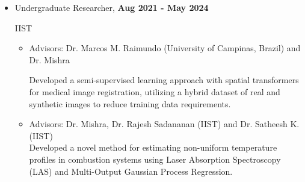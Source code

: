 \documentclass[11pt]{article}
\begin{document}
\begin{itemize}[leftmargin=*,noitemsep,topsep=0pt]
\begin{comment}
			\item Undergraduate Researcher, \hfill \textbf{Aug 2021 - May 2024} \\
	Indian Institute of Space Science and Technology
	\begin{itemize}[leftmargin=*,noitemsep,topsep=0pt]
		\item Collaborated with Dr. Marcos M. Raimundo (University of Campinas, Brazil) and Dr. Mishra to develop a semi-supervised learning approach with spatial transformers for medical image registration, utilizing a hybrid dataset of real and synthetic images to reduce training data requirements while leveraging transfer learning to curtail computational overhead.	
		\item Created and validated a Schlieren/RGB Flame Images Analyzing Tool based on Fast Fourier Transform (FFT) and Wavelet Transform to analyze time-series flame images to identify the region of instability and the corresponding oscillating frequency in collaboration with Dr. Rajesh
		Sadananan (IIST).
		\item Collaborated with Dr. Manoj B.S. (IIST) on a Complex Network Analysis project, focusing on the OPEC Crude Oil Trade Network. Utilized graph theory to model global crude oil flows between nations, identifying key time-series trends and predicting potential fluctuations in price and demand.
	\end{itemize}

\end{comment}

		
	\item Undergraduate Researcher, \hfill \textbf{Aug 2021 - May 2024}
	
	IIST

	
	\begin{itemize}[leftmargin=*,noitemsep,topsep=0pt]
		
		\item Advisors: Dr. Marcos M. Raimundo (University of Campinas, Brazil) and Dr. Mishra
		
		
		Developed a semi-supervised learning approach with spatial transformers for medical image registration, utilizing a hybrid dataset of real and synthetic images to reduce training data requirements.
		
			\item 	Advisors: Dr. Mishra, Dr. Rajesh Sadananan (IIST) and Dr. Satheesh K. (IIST) \\
		Developed a novel method for estimating non-uniform temperature profiles in combustion systems using Laser Absorption Spectroscopy (LAS) and Multi-Output Gaussian Process Regression.
		

\end{itemize}
\end{itemize}
\end{document}
